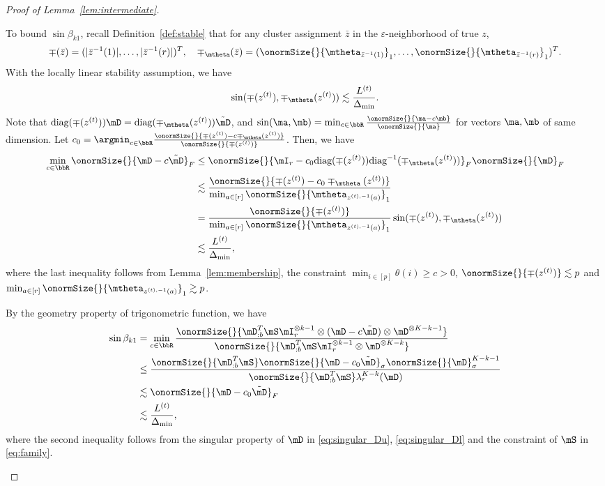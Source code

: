 \documentclass[lettersize,onecolumn,journal]{IEEEtran}
\theoremstyle{definition}
\theoremstyle{definition}
\begin{document}
\begin{proof}[Proof of Lemma~\ref{lem:intermediate}]
\begin{enumerate}[wide]
    To bound $\sin \beta_{k1}$, recall Definition~\ref{def:stable} that for any cluster assignment $\bar z$ in the $\varepsilon$-neighborhood of true $z$,
    \begin{equation}
        \mp(\bar z)=(|\bar z^{-1}(1)|, \ldots,|\bar z^{-1}(r)|)^T,\quad \mp_{\mtheta}(\bar z)=(\onormSize{}{\mtheta_{\bar z^{-1}(1)}}_1,\ldots,\onormSize{}{\mtheta_{\bar z^{-1}(r)}}_1)^T.
    \end{equation}
    With the locally linear stability assumption, we have 
    \begin{equation}
         \sin (\mp(z^{(t)}), \mp_{\mtheta}(z^{(t)})) \lesssim \frac{L^{(t)}}{\Delta_{\min}}. 
    \end{equation}
    Note that $\text{diag}(\mp(z^{(t)})) \mD = \text{diag}(\mp_{\mtheta}(z^{(t)})) \tilde \mD$, and $\sin(\ma,\mb) =\min_{c \in \bbR} \frac{ \onormSize{}{\ma - c\mb} }{\onormSize{}{\ma}}$ for vectors $\ma,\mb$ of same dimension. Let $c_0 = \argmin_{c \in \bbR} \frac{\onormSize{}{\mp(z^{(t)}) - c\mp_{\mtheta}(z^{(t)})}}{\onormSize{}{\mp(z^{(t)})}}$. Then, we have
    \begin{align}
      \min_{c \in \bbR} \onormSize{}{ \mD - c \tilde \mD}_F &\leq  \onormSize{}{ \mI_r - c_0 \text{diag}(\mp(z^{(t)})) \text{diag}^{-1}(\mp_{\mtheta}(z^{(t)}))}_F \onormSize{}{\mD}_F\\
      &\lesssim \frac{ \onormSize{}{ \mp(z^{(t)}) - c_0\mp_{\mtheta}(z^{(t)})} }{\min_{a \in [r]} \onormSize{}{\mtheta_{z^{(t),-1}(a)} }_1  } \\
      & = \frac{\onormSize{}{ \mp(z^{(t)})} }{\min_{a \in [r]} \onormSize{}{\mtheta_{z^{(t),-1}(a)} }_1 } \sin (\mp(z^{(t)}), \mp_{\mtheta}(z^{(t)}))\\
      & \lesssim \frac{L^{(t)}}{\Delta_{\min}},
    \end{align}
    where the last inequality follows from Lemma~\ref{lem:membership}, the constraint $\min_{i \in [p]}\theta(i) \geq c>0$, $\onormSize{}{ \mp(z^{(t)})} \lesssim p$ and $\min_{a \in [r]} \onormSize{}{\mtheta_{z^{(t),-1}(a)} }_1  \gtrsim p$. 
    
    By the geometry property of trigonometric function, we have
    \begin{align}\label{eq:b1}
        \sin \beta_{k1} &= \min_{c \in \bbR} \frac{\onormSize{}{\mD_{:b}^{T} \mS \mI_r^{\otimes k-1} \otimes (\mD - c \tilde \mD) \otimes \mD^{\otimes K-k - 1} } }{ \onormSize{}{\mD_{:b}^{T} \mS \mI_r^{\otimes k-1} \otimes \mD^{\otimes K-k}} }\\
        &\leq \frac{ \onormSize{}{\mD_{:b}^{T} \mS} \onormSize{}{\mD - c_0 \tilde \mD}_{\sigma} \onormSize{}{\mD}_{\sigma}^{K-k-1} }{\onormSize{}{\mD_{:b}^{T} \mS} \lambda_r^{K-k}(\mD) }\\
        & \lesssim  \onormSize{}{\mD - c_0 \tilde \mD}_{F}\\
        & \lesssim \frac{L^{(t)}}{\Delta_{\min}},
    \end{align}
    where the second inequality follows from the singular property of $\mD$ in \eqref{eq:singular_Du}, \eqref{eq:singular_Dl} and the constraint of $\mS$ in \eqref{eq:family}.
    

\end{enumerate}
\end{proof}
\end{document}
